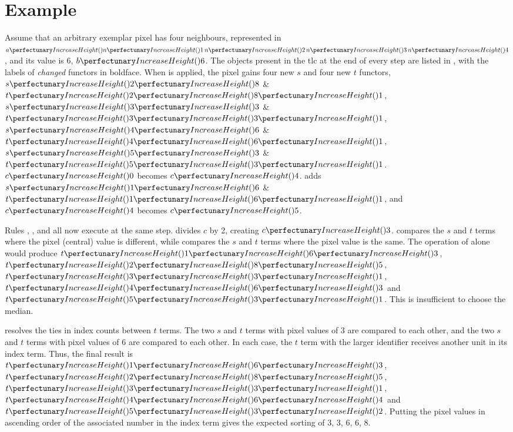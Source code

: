 
\section{ Example}

Assume that an arbitrary exemplar pixel has four neighbours, represented in \(\cpfunc{a}{\cpfunc{n}{1} \, \cpfunc{n}{2} \, \cpfunc{n}{3} \, \cpfunc{n}{4}}\), and its value is 6, \(\cpfunc{b}{6}\).  The objects present in the \gls{tlc} at the end of every step are listed in , with the labels of \emph{changed} functors in boldface.  When  is applied, the pixel gains four new \(s\) and four new \(t\) \glspl{functor}, \(\cpfuncn{s}{2}{8}\) \& \(\cpfuncnn{t}{2}{8}{1}\), \(\cpfuncn{s}{3}{3}\) \& \(\cpfuncnn{t}{3}{3}{1}\), \(\cpfuncn{s}{4}{6}\) \& \(\cpfuncnn{t}{4}{6}{1}\), \(\cpfuncn{s}{5}{3}\) \& \(\cpfuncnn{t}{5}{3}{1}\).  \(\cpfunc{c}{0}\) becomes \(\cpfunc{c}{4}\).   adds \(\cpfuncn{s}{1}{6}\) \& \(\cpfuncnn{t}{1}{6}{1}\), and \(\cpfunc{c}{4}\) becomes \(\cpfunc{c}{5}\).

Rules , , and  all now execute at the same step.   divides \(c\) by 2, creating \(\cpfunc{c}{3}\).   compares the \(s\) and \(t\) terms where the pixel (central) value is different, while  compares the \(s\) and \(t\) terms where the pixel value is the same.  The operation of  alone would produce \(\cpfuncnn{t}{1}{6}{3}\), \(\cpfuncnn{t}{2}{8}{5}\), \(\cpfuncnn{t}{3}{3}{1}\), \(\cpfuncnn{t}{4}{6}{3}\) and \(\cpfuncnn{t}{5}{3}{1}\).  This is insufficient to choose the median.

 resolves the ties in index counts between \(t\) terms.  The two \(s\) and \(t\) terms with pixel values of 3 are compared to each other, and the two \(s\) and \(t\) terms with pixel values of 6 are compared to each other.  In each case, the \(t\) term with the larger identifier receives another unit in its index term.  Thus, the final result is \(\cpfuncnn{t}{1}{6}{3}\), \(\cpfuncnn{t}{2}{8}{5}\), \(\cpfuncnn{t}{3}{3}{1}\), \(\cpfuncnn{t}{4}{6}{4}\) and \(\cpfuncnn{t}{5}{3}{2}\).  Putting the pixel values in ascending order of the associated number in the index term gives the expected sorting of 3, 3, 6, 6, 8.

